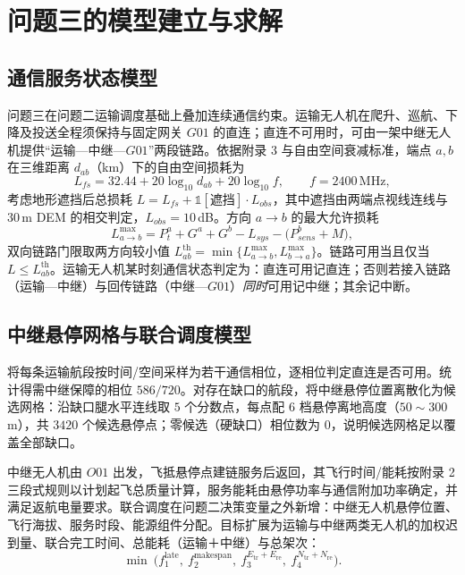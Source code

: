 \section{问题三的模型建立与求解}

\subsection{通信服务状态模型}

问题三在问题二运输调度基础上叠加连续通信约束。运输无人机在爬升、巡航、下降及投送全程须保持与固定网关 $G01$ 的直连；直连不可用时，可由一架中继无人机提供“运输—中继—$G01$”两段链路。依据附录 3 与自由空间衰减标准\cite{ref_itu,ref_zeng}，端点 $a,b$ 在三维距离 $d_{ab}$（km）下的自由空间损耗为
\begin{equation}
L_{fs}=32.44+20\log_{10} d_{ab}+20\log_{10} f,\qquad f=2400\,\text{MHz},
\end{equation}
考虑地形遮挡后总损耗 $L=L_{fs}+\mathbb{1}[\text{遮挡}]\cdot L_{obs}$，其中遮挡由两端点视线连线与 $30\,$m DEM 的相交判定，$L_{obs}=10\,$dB。方向 $a\to b$ 的最大允许损耗
\begin{equation}
L^{\max}_{a\to b}=P_t^{a}+G^{a}+G^{b}-L_{sys}-\big(P_{sens}^{b}+M\big),
\end{equation}
双向链路门限取两方向较小值 $L^{\text{th}}_{ab}=\min\{L^{\max}_{a\to b},L^{\max}_{b\to a}\}$。链路可用当且仅当 $L\le L^{\text{th}}_{ab}$。运输无人机某时刻通信状态判定为：直连可用记直连；否则若接入链路（运输—中继）与回传链路（中继—$G01$）\emph{同时}可用记中继；其余记中断。

\subsection{中继悬停网格与联合调度模型}

将每条运输航段按时间/空间采样为若干通信相位，逐相位判定直连是否可用。统计得需中继保障的相位 $586/720$。对存在缺口的航段，将中继悬停位置离散化为候选网格：沿缺口腿水平连线取 $5$ 个分数点，每点配 $6$ 档悬停离地高度（$50\!\sim\!300\,$m），共 $3420$ 个候选悬停点；零候选（硬缺口）相位数为 $0$，说明候选网格足以覆盖全部缺口。

中继无人机由 $O01$ 出发，飞抵悬停点建链服务后返回，其飞行时间/能耗按附录 2 三段式规则以计划起飞总质量计算，服务能耗由悬停功率与通信附加功率确定，并满足返航电量要求。联合调度在问题二决策变量之外新增：中继无人机悬停位置、飞行海拔、服务时段、能源组件分配。目标扩展为运输与中继两类无人机的加权迟到量、联合完工时间、总能耗（运输＋中继）与总架次：
\begin{equation}
\min\ \big(f_1^{\text{late}},\ f_2^{\text{makespan}},\ f_3^{E_{\text{tr}}+E_{\text{re}}},\ f_4^{N_{\text{tr}}+N_{\text{re}}}\big).
\end{equation}

